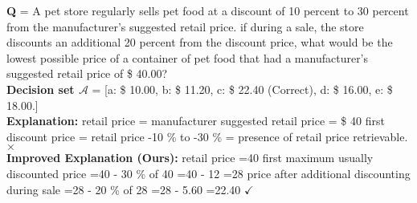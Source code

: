 
\begin{tcolorbox}[title=An example on $\mathtt{MathQA}$ that a negative explanation generated by the \rlm~is optimized to a positive explanation after training for two rounds]

    \textbf{Q} = A pet store regularly sells pet food at a discount of 10 percent to 30 percent from the manufacturer’s suggested retail price. if during a sale, the store discounts an additional 20 percent from the discount price, what would be the lowest possible price of a container of pet food that had a manufacturer’s suggested retail price of \$ 40.00?\\

    \textbf{Decision set $\mathcal{A}$} = [a: \$ 10.00, b: \$ 11.20, \textcolor{outputcolor}{c: \$ 22.40 (Correct)}, d: \$ 16.00, e: \$ 18.00.]\\
    
    \textbf{{Explanation:}} retail price = manufacturer suggested retail price = \$ 40 first discount price = retail price {\color{red}-10 \% to -30 \% = presence of retail price retrievable.$\boldsymbol{\times}$}   \\
    
    \textbf{{Improved Explanation (Ours):}} retail price =40 first maximum usually discounted price =40 - 30 \% of 40 =40 - 12 =28 price after additional discounting during sale =\textcolor{outputcolor}{28 - 20 \% of 28 =28 - 5.60 =22.40 $\checkmark$} \\

\end{tcolorbox}




